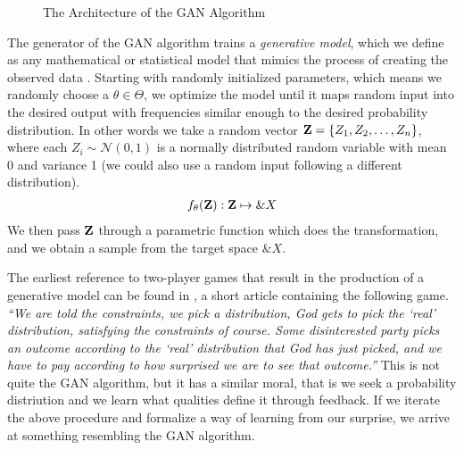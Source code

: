 \begin{figure}[H]
  \caption{The Architecture of the GAN Algorithm}
\end{figure}

The generator of the GAN algorithm trains a \textit{generative model},
which we define as any mathematical or statistical model that mimics
the process of creating the observed data \cite{ref:bishop}. Starting
with randomly initialized parameters, which means we randomly choose a
$\theta \in \Theta$, we optimize the model until it maps random input
into the desired output with frequencies similar enough to the desired
probability distribution. In other words we take a random vector $\mathbf{Z}
= \left\{Z_1, Z_2, \dots, Z_n\right\}$, where each $Z_i \sim
\mathcal{N}(0, 1)$ is a normally distributed random variable with mean
0 and variance 1 (we could also use a random input following a
different distribution).
\begin{align}
  \label{eq:gen-model} f_\theta(\mathbf{Z}): \mathbf{Z} \mapsto \&X
\end{align} We then pass $\mathbf{Z}$ through a parametric function which
does the transformation, and we obtain a sample from the target space
$\&X$.

The earliest reference to two-player games that result in the
production of a generative model can be found in \cite{ref:doyle}, a
short article containing the following game. \textit{``We are told the
constraints, we pick a distribution, God gets to pick the `real'
distribution, satisfying the constraints of course. Some disinterested
party picks an outcome according to the `real' distribution that God
has just picked, and we have to pay according to how surprised we are
to see that outcome.''} This is not quite the GAN algorithm, but it
has a similar moral, that is we seek a probability distriution and we
learn what qualities define it through feedback. If we iterate the
above procedure and formalize a way of learning from our surprise, we
arrive at something resembling the GAN algorithm.

